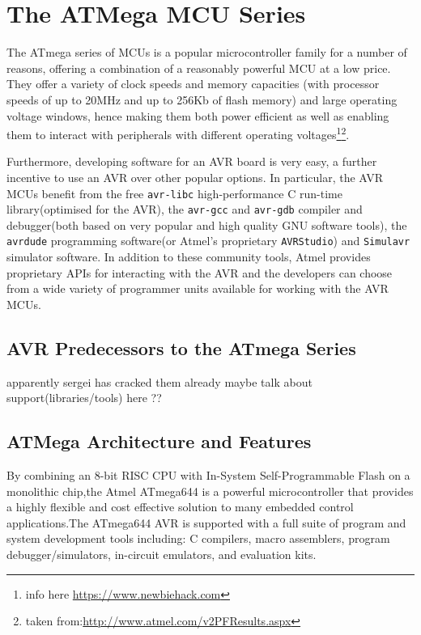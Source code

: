 \documentclass[12pt,a4paper,twocolumn]{article}
\begin{document}
\section{The ATMega MCU Series}
	The ATmega series of MCUs is a popular microcontroller family for a number of reasons, offering a combination of a reasonably powerful MCU at a low price. They offer a variety of clock speeds and memory capacities (with processor speeds of up to 20MHz and up to 256Kb of flash memory) and large operating voltage windows, hence making them both power efficient as well as enabling them to interact with peripherals with different operating voltages\footnote{info here \href{https://www.newbiehack.com/MicrocontrollersAlternativePowerSources.aspx}{https://www.newbiehack.com}}\footnote{taken from:\href{http://www.atmel.com/v2PFResults.aspx}{http://www.atmel.com/v2PFResults.aspx}}.
	
	Furthermore, developing software for an AVR board is very easy, a further incentive to use an AVR over other popular options. In particular, the AVR MCUs benefit from the free \texttt{avr-libc} high-performance C run-time library(optimised for the AVR), the \texttt{avr-gcc} and \texttt{avr-gdb} compiler and debugger(both based on very popular and high quality GNU software tools), the \texttt{avrdude} programming software(or Atmel's proprietary \texttt{AVRStudio}) and \texttt{Simulavr} simulator software. In addition to these community tools, Atmel provides proprietary APIs for interacting with the AVR and the developers can choose from a wide variety of programmer units available for working with the AVR MCUs.
	
	\subsection{AVR Predecessors to the ATmega Series}
	apparently sergei has cracked them already
	maybe talk about support(libraries/tools) here ?? \cite{website:scorobogatov_breaking_copy_protection}
	\subsection{ATMega Architecture and Features}				
By combining an 8-bit RISC CPU with In-System Self-Programmable Flash on a monolithic chip,the Atmel ATmega644 is a powerful microcontroller that provides a highly flexible and cost effective solution to many embedded control applications.The ATmega644 AVR is supported with a full suite of program and system development tools including: C compilers, macro assemblers, program debugger/simulators, in-circuit emulators, and evaluation kits.	
\end{document}
